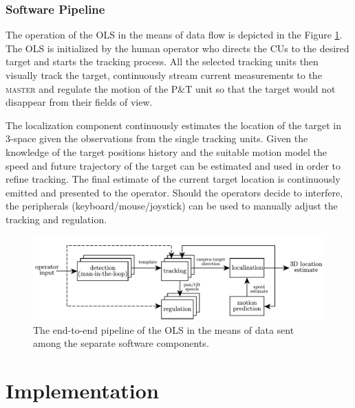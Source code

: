\subsection{Software Pipeline} \label{txt:sw_pipeline}

The operation of the OLS in the means of data flow is depicted in the Figure \ref{fig:pipeline}. The OLS is initialized by the human operator who directs the CUs to the desired target and starts the tracking process. All the selected tracking units then visually track the target, continuously stream current measurements to the \textsc{master} and regulate the motion of the P\&T unit so that the target would not disappear from their fields of view.

The localization component continuously estimates the location of the target in 3-space given the observations from the single tracking units. Given the knowledge of the target positions history and the suitable motion model the speed and future trajectory of the target can be estimated and used in order to refine tracking. The final estimate of the current target location is continuously emitted and presented to the operator. Should the operators decide to interfere, the peripherals (keyboard/mouse/joystick) can be used to manually adjust the tracking and regulation.

\begin{figure}[htb]
	\centering
	\includegraphics[width=0.95\linewidth]{fig/pipeline.pdf}
	\caption{The end-to-end pipeline of the OLS in the means of data sent among the separate software components.}
	\label{fig:pipeline}
\end{figure}


\chapter{Implementation} \label{txt:implementation}

